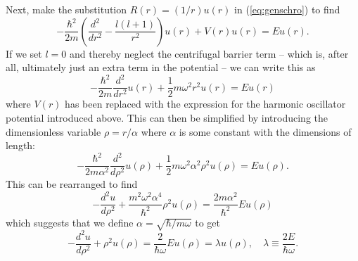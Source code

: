 \documentclass[aps,prc,reprint,nobalancelastpage]{revtex4-1}
\begin{document}
        Next, make the substitution $R(r) = (1/r) u(r)$ in (\ref{eq:genschro}) to find
        \begin{equation*}
            -\frac{\hbar^2}{2m} \left( \frac{d^2}{dr^2} - \frac{l(l+1)}{r^2} \right) u(r) + V(r)u(r) = Eu(r).
        \end{equation*}
        If we set $l = 0$ and thereby neglect the centrifugal barrier term -- which is, after all, ultimately just an extra term in the potential -- we can write this as
        \begin{equation*}
            -\frac{\hbar^2}{2m} \frac{d^2}{dr^2} u(r) + \frac{1}{2} m \omega^2 r^2 u(r) = Eu(r)
        \end{equation*}
        where $V(r)$ has been replaced with the expression for the harmonic oscillator potential introduced above. This can then be simplified by introducing the dimensionless variable $\rho = r / \alpha$ where $\alpha$ is some constant with the dimensions of length:
        \begin{equation*}
            -\frac{\hbar^2}{2m\alpha^2} \frac{d^2}{d\rho^2} u(\rho) + \frac{1}{2} m \omega^2 \alpha^2 \rho^2 u(\rho) = Eu(\rho).
        \end{equation*}
        This can be rearranged to find
        \begin{equation*}
            -\frac{d^2 u}{d\rho^2} + \frac{m^2\omega^2\alpha^4}{\hbar^2} \rho^2 u(\rho) = \frac{2m\alpha^2}{\hbar^2} E u(\rho)
        \end{equation*}
        which suggests that we define $\alpha = \sqrt{\hbar / m\omega}$ to get
        \begin{equation}
            -\frac{d^2 u}{d\rho^2} + \rho^2 u(\rho) = \frac{2}{\hbar\omega} E u(\rho) = \lambda u(\rho),\quad \lambda \equiv \frac{2E}{\hbar\omega}.  \label{eq:oneelecfinal}
        \end{equation}
\end{document}
